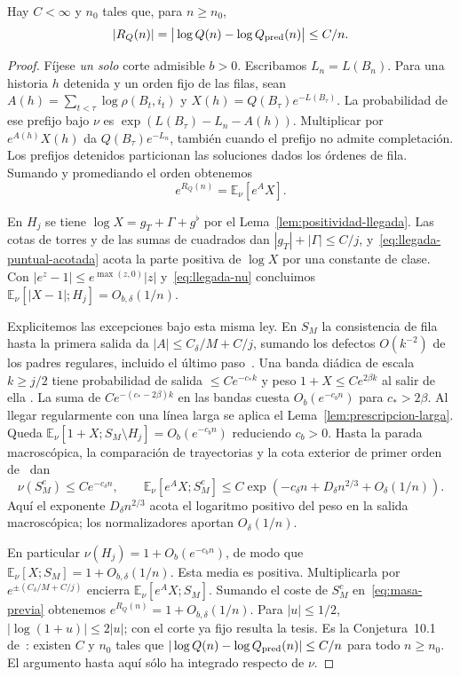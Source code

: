 \begin{lema}\label{lem:previa}
Hay \(C<\infty\) y \(n_0\) tales que, para \(n\ge n_0\),
\[
 |R_Q(n)|=\big|\log Q(n)-\log Q_{\rm pred}(n)\big|\le C/n .
\]
\end{lema}
\begin{proof}
Fíjese \emph{un solo} corte admisible \(b>0\). Escribamos \(L_n=L(B_n)\).
Para una historia \(h\) detenida y un orden fijo de las filas, sean
\(A(h)=\sum_{t<\tau}\log\rho(B_t,i_t)\) y \(X(h)=Q(B_\tau)e^{-L(B_\tau)}\).
La probabilidad de ese prefijo bajo \(\nu\) es
\(\exp(L(B_\tau)-L_n-A(h))\). Multiplicar por \(e^{A(h)}X(h)\) da \(Q(B_\tau)e^{-L_n}\),
también cuando el prefijo no admite completación. Los prefijos detenidos particionan
las soluciones dados los órdenes de fila. Sumando y promediando el orden obtenemos
\begin{equation}\label{eq:masa-previa}
 e^{R_Q(n)}=\mathbb E_\nu[e^A X].
\end{equation}

En \(H_j\) se tiene \(\log X=g_T+\Gamma+g^\flat\) por el
Lema~\ref{lem:positividad-llegada}. Las cotas de torres y de las sumas de cuadrados dan
\(|g_T|+|\Gamma|\le C/j\), y~\eqref{eq:llegada-puntual-acotada} acota la parte positiva
de \(\log X\) por una constante de clase. Con \(|e^z-1|\le e^{\max(z,0)}|z|\)
y~\eqref{eq:llegada-nu} concluimos \(\mathbb E_\nu[|X-1|;H_j]=O_{b,\delta}(1/n)\).

Explicitemos las excepciones bajo esta misma ley. En \(S_M\) la consistencia de fila
hasta la primera salida da \(|A|\le C_\delta/M+C/j\), sumando los defectos \(O(k^{-2})\)
de los padres regulares, incluido el último paso~\cite[teos.~7.1 y 8.1]{pc}.
Una banda diádica de escala \(k\ge j/2\) tiene probabilidad de salida
\(\le Ce^{-c_*k}\) y peso \(1+X\le C e^{2\beta k}\) al salir de ella
\cite[§§5--6]{tc}. La suma de \(Ce^{-(c_*-2\beta)k}\) en las bandas cuesta
\(O_b(e^{-c_b n})\) para \(c_*>2\beta\). Al llegar regularmente con una línea larga
se aplica el Lema~\ref{lem:prescripcion-larga}. Queda
\(\mathbb E_\nu[1+X;S_M\setminus H_j]=O_b(e^{-c_b n})\) reduciendo \(c_b>0\).
Hasta la parada macroscópica, la comparación de trayectorias y la cota exterior de
primer orden de~\cite[cor.~4.12 y §6]{tc} dan
\[
 \nu(S_M^c)\le C e^{-c_\delta n},\qquad
 \mathbb E_\nu[e^A X;S_M^c]\le
 C\exp(-c_\delta n+D_\delta n^{2/3}+O_\delta(1/n)).
\]
Aquí el exponente \(D_\delta n^{2/3}\) acota el logaritmo positivo del peso en la salida
macroscópica; los normalizadores aportan \(O_\delta(1/n)\).

En particular \(\nu(H_j)=1+O_b(e^{-c_bn})\), de modo que
\(\mathbb E_\nu[X;S_M]=1+O_{b,\delta}(1/n)\). Esta media es positiva. Multiplicarla
por \(e^{\pm(C_\delta/M+C/j)}\) encierra \(\mathbb E_\nu[e^AX;S_M]\).
Sumando el coste de \(S_M^c\) en~\eqref{eq:masa-previa} obtenemos
\(e^{R_Q(n)}=1+O_{b,\delta}(1/n)\). Para \(|u|\le1/2\), \(|\log(1+u)|\le2|u|\);
con el corte ya fijo resulta la tesis. Es la
Conjetura~10.1 de~\cite{pc}: existen \(C\) y \(n_0\) tales que
\(|\log Q(n)-\log Q_{\rm pred}(n)|\le C/n\) para todo \(n\ge n_0\). El argumento hasta aquí sólo ha
integrado respecto de \(\nu\).
\end{proof}
